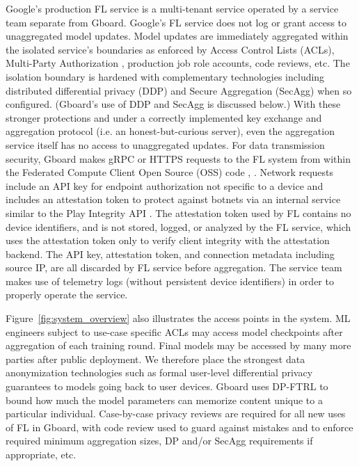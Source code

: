 \documentclass{article}
\begin{document}
Google’s production FL service is a multi-tenant service operated by a service team separate from Gboard. Google’s FL service does not log or grant access to unaggregated model updates. Model updates are immediately aggregated within the isolated service’s boundaries as enforced by Access Control Lists (ACLs), Multi-Party Authorization \cite{mpa}, production job role accounts, code reviews, etc. The isolation boundary is hardened with complementary technologies including distributed differential privacy (DDP) \cite{ddpsecagg, skellamdp, tffddpsecagg} and Secure Aggregation (SecAgg) \cite{practicalsecagg} when so configured. (Gboard’s use of DDP and SecAgg is discussed below.) With these stronger protections and under a correctly implemented key exchange and aggregation protocol (i.e. an honest-but-curious server), even the aggregation service itself has no access to unaggregated updates. For data transmission security, Gboard makes gRPC or HTTPS requests to the FL system from within the Federated Compute Client Open Source (OSS) code \cite{httpfedprotocol}, \cite{grpcfedprotocol}. Network requests include an API key for endpoint authorization not specific to a device and includes an attestation token to protect against botnets via an internal service similar to the Play Integrity API \cite{playintegrity}. The attestation token used by FL contains no device identifiers, and is not stored, logged, or analyzed by the FL service, which uses the attestation token only to verify client integrity with the attestation backend. The API key, attestation token, and connection metadata including source IP, are all discarded by FL service before aggregation. The service team makes use of telemetry logs (without persistent device identifiers) in order to properly operate the service.

Figure~\ref{fig:system_overview} also illustrates the access points in the system. ML engineers subject to use-case specific ACLs may access model checkpoints after aggregation of each training round. Final models may be accessed by many more parties after public deployment. We therefore place the strongest data anonymization technologies such as formal user-level differential privacy guarantees to models going back to user devices. Gboard uses DP-FTRL \cite{dpftrl} to bound how much the model parameters can memorize content unique to a particular individual. Case-by-case privacy reviews are required for all new uses of FL in Gboard, with code review used to guard against mistakes and to enforce required minimum aggregation sizes, DP and/or SecAgg requirements if appropriate, etc.
\end{document}
